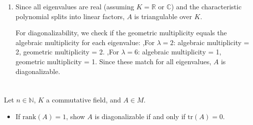 \documentclass[12pt]{article}
\begin{document}
\begin{correctionbox}
\begin{enumerate}
    \textbf{Eigenspace for $\lambda = 6$:} Solve $(A - 6I)v = 0$:
    \[
    A - 6I = \begin{pmatrix}
    -3 & 1 & 1 \\
    2 & -2 & 2 \\
    1 & 1 & -3
    \end{pmatrix} \xrightarrow{\text{row reduction}} \begin{pmatrix}
    1 & 0 & -1 \\
    0 & 1 & -2 \\
    0 & 0 & 0
    \end{pmatrix}.
    \]
    The equations are $x = z$ and $y = 2z$. A basis is:
    \[
    \left\{ \begin{pmatrix}1 \\ 2 \\ 1\end{pmatrix} \right\}.
    \]
    The geometric multiplicity is 1.

    \item Since all eigenvalues are real (assuming $K = \mathbb{R}$ or $\mathbb{C}$) and the characteristic polynomial splits into linear factors, $A$ is triangulable over $K$.

    For diagonalizability, we check if the geometric multiplicity equals the algebraic multiplicity for each eigenvalue:
   ,For $\lambda = 2$: algebraic multiplicity = 2, geometric multiplicity = 2.
   ,For $\lambda = 6$: algebraic multiplicity = 1, geometric multiplicity = 1.
    Since these match for all eigenvalues, $A$ is diagonalizable.
\end{enumerate}
\end{correctionbox}

\section{}
Let \( n \in \mathbb{N} \), \( K \) a commutative field, and \( A \in M \).
\begin{itemize}
    \item If \( \mathrm{rank}(A) = 1 \), show \( A \) is diagonalizable if and only if \( \mathrm{tr}(A) = 0 \).
\end{itemize}
\end{document}
